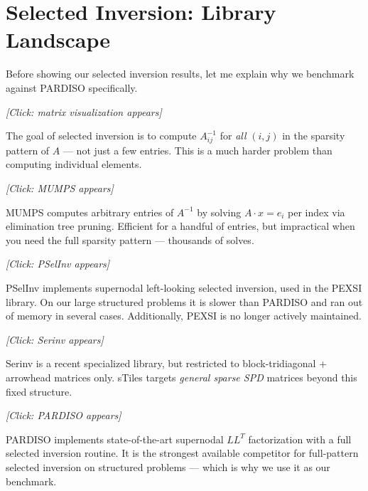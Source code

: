 \documentclass[11pt,a4paper]{article}
\begin{document}
\vspace{1em}

\section{Selected Inversion: Library Landscape}

\begin{speech}
Before showing our selected inversion results, let me explain why we benchmark against PARDISO specifically.

\textit{[Click: matrix visualization appears]}

The goal of selected inversion is to compute $A^{-1}_{ij}$ for \textit{all} $(i,j)$ in the sparsity pattern of $A$ --- not just a few entries. This is a much harder problem than computing individual elements.

\textit{[Click: MUMPS appears]}

MUMPS computes arbitrary entries of $A^{-1}$ by solving $A \cdot x = e_i$ per index via elimination tree pruning. Efficient for a handful of entries, but impractical when you need the full sparsity pattern --- thousands of solves.

\textit{[Click: PSelInv appears]}

PSelInv implements supernodal left-looking selected inversion, used in the PEXSI library. On our large structured problems it is slower than PARDISO and ran out of memory in several cases. Additionally, PEXSI is no longer actively maintained.

\textit{[Click: Serinv appears]}

Serinv is a recent specialized library, but restricted to block-tridiagonal + arrowhead matrices only. sTiles targets \textit{general sparse SPD} matrices beyond this fixed structure.

\textit{[Click: PARDISO appears]}

PARDISO implements state-of-the-art supernodal $LL^T$ factorization with a full selected inversion routine. It is the strongest available competitor for full-pattern selected inversion on structured problems --- which is why we use it as our benchmark.
\end{speech}

\vspace{1em}

\end{document}
